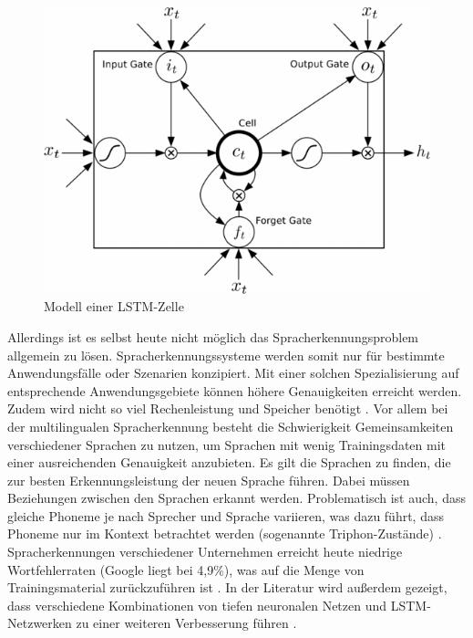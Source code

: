 \begin{figure}[h!]
	\centering
	\includegraphics[width=0.9\linewidth]{images/lstm_cell}
	\caption{Modell einer LSTM-Zelle \cite{deeplearning4j}} %
	\label{fig:lstm}
\end{figure}  

Allerdings ist es selbst heute nicht möglich das Spracherkennungsproblem allgemein zu lösen. Spracherkennungssysteme werden somit nur für bestimmte Anwendungsfälle oder Szenarien konzipiert. Mit einer solchen Spezialisierung auf entsprechende Anwendungsgebiete können höhere Genauigkeiten erreicht werden. Zudem wird nicht so viel Rechenleistung und Speicher benötigt {\cite{beat_tobias}}. Vor allem bei der multilingualen Spracherkennung besteht die Schwierigkeit Gemeinsamkeiten verschiedener Sprachen zu nutzen, um Sprachen mit wenig Trainingsdaten mit einer ausreichenden Genauigkeit anzubieten. Es gilt die Sprachen zu finden, die zur besten Erkennungsleistung der neuen Sprache führen. Dabei müssen Beziehungen zwischen den Sprachen erkannt werden. Problematisch ist auch, dass gleiche Phoneme je nach Sprecher und Sprache variieren, was dazu führt, dass Phoneme nur im Kontext betrachtet werden (sogenannte Triphon-Zustände) {\cite{Yu.2014}}. Spracherkennungen verschiedener Unternehmen erreicht heute niedrige Wortfehlerraten (Google liegt bei 4,9\%), was auf die Menge von Trainingsmaterial zurückzuführen ist {\cite{venturebeat}} {\cite{9to5google}} {\cite{businessinsider}}. In der Literatur wird außerdem gezeigt, dass verschiedene Kombinationen von tiefen neuronalen Netzen und LSTM-Netzwerken zu einer weiteren Verbesserung führen {\cite{6638947}}. 